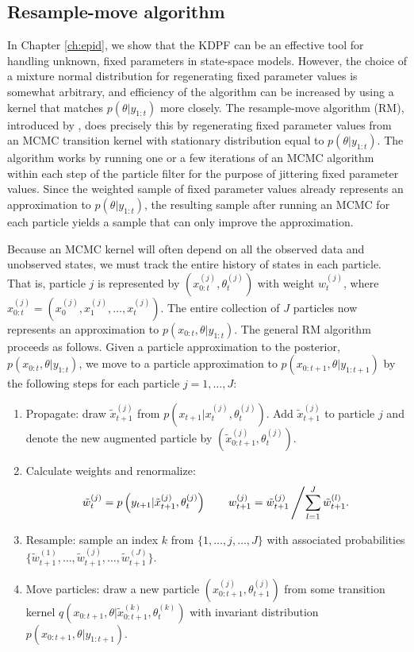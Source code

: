 \subsection{Resample-move algorithm} \label{sec:rm}

In Chapter \ref{ch:epid}, we show that the KDPF can be an effective tool for handling unknown, fixed parameters in state-space models. However, the choice of a mixture normal distribution for regenerating fixed parameter values is somewhat arbitrary, and efficiency of the algorithm can be increased by using a kernel that matches $p(\theta|y_{1:t})$ more closely. The resample-move algorithm (RM), introduced by \citet{Gilk:Berz:foll:2001}, does precisely this by regenerating fixed parameter values from an MCMC transition kernel with stationary distribution equal to $p(\theta|y_{1:t})$. The algorithm works by running one or a few iterations of an MCMC algorithm within each step of the particle filter for the purpose of jittering fixed parameter values. Since the weighted sample of fixed parameter values already represents an approximation to $p(\theta|y_{1:t})$, the resulting sample after running an MCMC for each particle yields a sample that can only improve the approximation.

Because an MCMC kernel will often depend on all the observed data and unobserved states, we must track the entire history of states in each particle. That is, particle $j$ is represented by $\left(x_{0:t}^{(j)},\theta_t^{(j)}\right)$ with weight $w_t^{(j)}$, where $x_{0:t}^{(j)} = (x_0^{(j)},x_1^{(j)},\ldots,x_t^{(j)})$. The entire collection of $J$ particles now represents an approximation to $p(x_{0:t},\theta|y_{1:t})$. The general RM algorithm proceeds as follows. Given a particle approximation to the posterior, $p(x_{0:t},\theta|y_{1:t})$, we move to a particle approximation to $p(x_{0:t+1},\theta|y_{1:t+1})$ by the following steps for each particle $j=1,\ldots,J$:
\begin{enumerate}
\item Propagate: draw $\tilde{x}^{(j)}_{t+1}$ from $p\left(x_{t+1}|x^{(j)}_t,\theta^{(j)}_t\right)$. Add $\tilde{x}^{(j)}_{t+1}$ to particle $j$ and denote the new augmented particle by $\left(\tilde{x}^{(j)}_{0:t+1},\theta^{(j)}_t\right)$.
\item Calculate weights and renormalize:
    \[\tilde{w}^{(j)}_t = p\left(y_{t+1}|\tilde{x}^{(j)}_{t+1},\theta^{(j)}_t\right) \qquad w^{(j)}_{t+1} = \tilde{w}_{t+1}^{(j)}\left/\sum_{l=1}^J \tilde{w}_{t+1}^{(l)}. \right.\]
\item Resample: sample an index $k$ from $\{1,\ldots,j,\ldots,J\}$ with associated probabilities $\{\tilde{w}^{(1)}_{t+1},\ldots,\tilde{w}^{(j)}_{t+1},\ldots,\tilde{w}^{(J)}_{t+1}\}$.
\item \label{step:move} Move particles: draw a new particle $\left(x^{(j)}_{0:t+1},\theta^{(j)}_{t+1}\right)$ from some transition kernel $q\left(x_{0:t+1},\theta|\tilde{x}^{(k)}_{0:t+1},\theta^{(k)}_t\right)$ with invariant distribution $p(x_{0:t+1},\theta|y_{1:t+1})$.
\end{enumerate}

